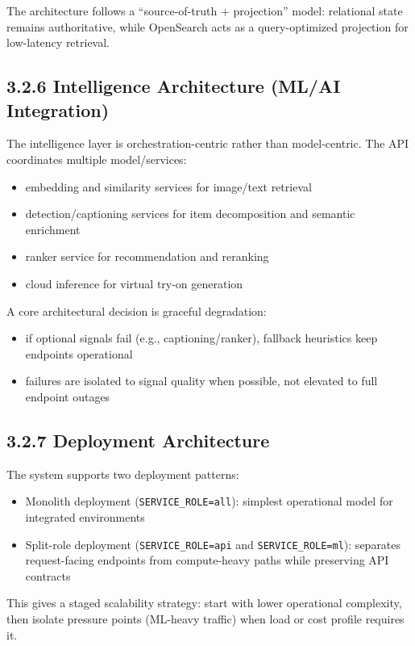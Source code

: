 \documentclass[12pt,a4paper]{report}
\begin{document}
The architecture follows a ``source-of-truth + projection'' model: relational state remains authoritative, while OpenSearch acts as a query-optimized projection for low-latency retrieval.

\subsection{3.2.6 Intelligence Architecture (ML/AI Integration)}
The intelligence layer is orchestration-centric rather than model-centric. The API coordinates multiple model/services:
\begin{itemize}
\item embedding and similarity services for image/text retrieval
\item detection/captioning services for item decomposition and semantic enrichment
\item ranker service for recommendation and reranking
\item cloud inference for virtual try-on generation
\end{itemize}

A core architectural decision is graceful degradation:
\begin{itemize}
\item if optional signals fail (e.g., captioning/ranker), fallback heuristics keep endpoints operational
\item failures are isolated to signal quality when possible, not elevated to full endpoint outages
\end{itemize}

\subsection{3.2.7 Deployment Architecture}
The system supports two deployment patterns:
\begin{itemize}
\item Monolith deployment (\texttt{SERVICE\_ROLE=all}): simplest operational model for integrated environments
\item Split-role deployment (\texttt{SERVICE\_ROLE=api} and \texttt{SERVICE\_ROLE=ml}): separates request-facing endpoints from compute-heavy paths while preserving API contracts
\end{itemize}

This gives a staged scalability strategy: start with lower operational complexity, then isolate pressure points (ML-heavy traffic) when load or cost profile requires it.
\end{document}
